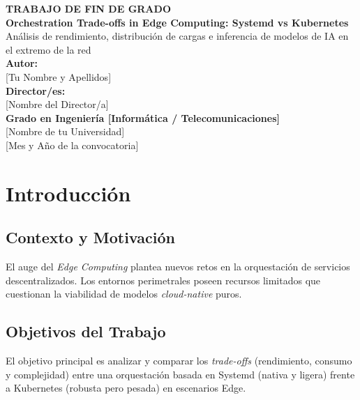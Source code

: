 \documentclass[11pt, a4paper]{report}
\begin{document}
\begin{titlepage}
    \centering
    \vspace*{2cm}
    
    {\Large \textbf{TRABAJO DE FIN DE GRADO}} \\[1.5cm]
    
    {\huge \textbf{Orchestration Trade-offs in Edge Computing: Systemd vs Kubernetes}}\\[0.5cm]
    {\Large Análisis de rendimiento, distribución de cargas e inferencia de modelos de IA en el extremo de la red}\\[2cm]
    
    {\Large \textbf{Autor:}} \\
    {\large [Tu Nombre y Apellidos]}\\[1cm]
    
    {\Large \textbf{Director/es:}} \\
    {\large [Nombre del Director/a]}\\[2cm]
    
    {\large \textbf{Grado en Ingeniería [Informática / Telecomunicaciones]}} \\[0.5cm]
    {\large [Nombre de tu Universidad]} \\[0.5cm]
    {\large [Mes y Año de la convocatoria]}
    
    \vfill
\end{titlepage}

\tableofcontents
\listoffigures
\listoftables
\cleardoublepage


\chapter{Introducción}

\section{Contexto y Motivación}
El auge del \textit{Edge Computing} plantea nuevos retos en la orquestación de servicios descentralizados. Los entornos perimetrales poseen recursos limitados que cuestionan la viabilidad de modelos \textit{cloud-native} puros.

\section{Objetivos del Trabajo}
El objetivo principal es analizar y comparar los \textit{trade-offs} (rendimiento, consumo y complejidad) entre una orquestación basada en Systemd (nativa y ligera) frente a Kubernetes (robusta pero pesada) en escenarios Edge.
\end{document}
